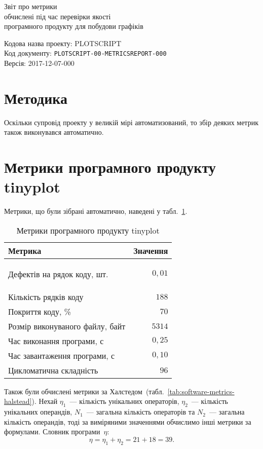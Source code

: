 \documentclass[a4paper,oneside,DIV=12,12pt]{scrartcl}
\newcommand{\progname}{tinyplot}
\newcommand{\theprojcode}{PLOTSCRIPT}
\newcommand{\theprojrev}{00}
\newcommand{\thedoctype}{METRICSREPORT}
\newcommand{\thedocnum}{000}
\newcommand{\thedocfullcode}{\theprojcode-\theprojrev-\thedoctype-\thedocnum}
\newcommand{\printdocfullcode}{\texttt{\thedocfullcode}}
\newcommand{\theversion}{2017-12-07-000}
\begin{document}
	\begin{titlepage}
	\begin{center}
		\vspace*{\fill}
			Звіт про метрики\\
			обчислені під час перевірки якості\\
			програмного продукту для побудови графіків
			
		\vspace*{\fill}
	\end{center}
	Кодова назва проекту: \theprojcode\\
	Код документу: \printdocfullcode\\
	Версія: \theversion\\
	\end{titlepage}
	
	
	\section{Методика}
		Оскільки супровід проекту у великій мірі автоматизований, то збір деяких метрик також виконувався автоматично.
		
	\section{Метрики програмного продукту \progname}
	\label{sec:collected-metrics}
	
		Метрики, що були зібрані автоматично, наведені у табл.~\ref{tab:software-metrics}.
		\begin{longtable}[c]{lr}
				\toprule
					Метрика & Значення\\
				\midrule
				\endhead
				\bottomrule
				\caption{Метрики програмного продукту \progname }
				\endfoot
				\label{tab:software-metrics}
				
					Дефектів на рядок коду, шт.     & $0{,}01$\\
					Кількість рядків коду           & $188$\\
					Покриття коду, \%               & $70$\\
					Розмір виконуваного файлу, байт & $5314$\\
					Час виконання програми, с       & $0{,}25$\\
					Час завантаження програми, с    & $0{,}10$\\
					Цикломатична складність         & $96$ \\
		\end{longtable}
		
		Також були обчислені метрики за Халстедом~(табл.~\ref{tab:software-metrics-halstead}). Нехай $\eta_1$~— кількість унікальних операторів, $\eta_2$~— кількість унікальних операндів, $N_1$~— загальна кількість операторів та $N_2$~— загальна кількість операндів, тоді за виміряними значеннями обчислимо інші метрики за формулами. Словник програми~$\eta$:
		\[
			\eta = \eta_1 + \eta_2 = 21 + 18 = 39.
		\]
		
\end{document}
